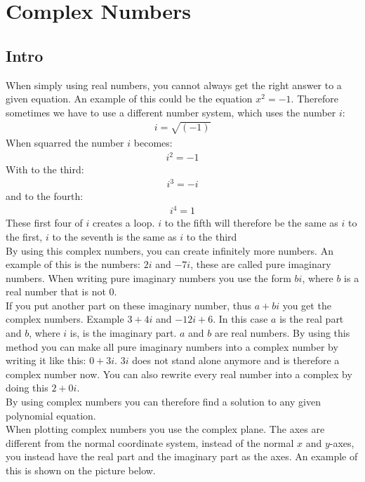 \chapter{Complex Numbers}
\section{Intro}
When simply using real numbers, you cannot always get the right answer to a given equation. An example of this could be the equation $x^2=-1$. Therefore sometimes we have to use a different number system, which uses the number $i$: 
\begin{align*}
 i=\sqrt{(-1)}
\end{align*}
When squarred the number $i$ becomes:
\begin{align*}
 i^2=-1
\end{align*}
With to the third:
\begin{align*}
 i^3=-i
\end{align*}
and to the fourth:
\begin{align*}
 i^4=1
\end{align*}
These first four of $i$ creates a loop. $i$ to the fifth will therefore be the same as $i$ to the first, $i$ to the seventh is the same as $i$ to the third \\
By using this complex numbers, you can create infinitely more numbers.  
An example of this is the numbers: $2i$ and $-7i$, these are called pure imaginary numbers. When writing pure imaginary numbers you use the form $bi$, where $b$ is a real number that is not $0$. \\
If you put another part on these imaginary number, thus $a+bi$ you get the complex numbers. Example $3+4i$ and $-12i+6$. In this case $a$ is the real part and $b$, where $i$ is, is the imaginary part. $a$ and $b$ are real numbers. By using this method you can make all pure imaginary numbers into a complex number by writing it like this: $0+3i$. $3i$ does not stand alone anymore and is therefore a complex number now. You can also rewrite every real number into a complex by doing this $2+0i$. \\
By using complex numbers you can therefore find a solution to any given polynomial equation. \\ 
When plotting complex numbers you use the complex plane. The axes are different from the normal coordinate system, instead of the normal $x$ and $y$-axes, you instead have the real part and the imaginary part as the axes. An example of this is shown on the picture below.
